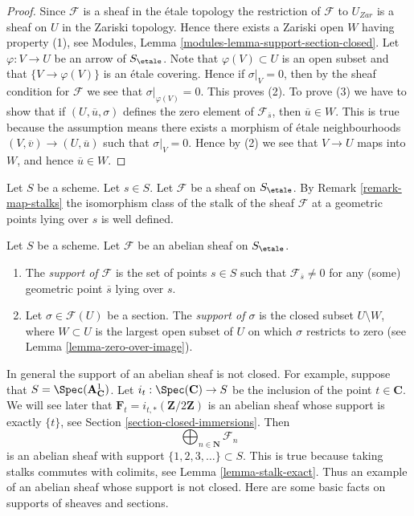 \begin{proof}
Since $\mathcal{F}$ is a sheaf in the \'etale topology the restriction of
$\mathcal{F}$ to $U_{Zar}$ is a sheaf on $U$ in the Zariski topology.
Hence there exists a Zariski open $W$ having property (1), see
Modules, Lemma \ref{modules-lemma-support-section-closed}. Let
$\varphi : V \to U$ be an arrow of $S_\etale$. Note that
$\varphi(V) \subset U$ is an open subset and that
$\{V \to \varphi(V)\}$ is an \'etale covering. Hence if
$\sigma|_V = 0$, then by the sheaf condition for $\mathcal{F}$ we
see that $\sigma|_{\varphi(V)} = 0$. This proves (2).
To prove (3) we have to show that if $(U, \overline{u}, \sigma)$
defines the zero element of $\mathcal{F}_{\overline{s}}$, then
$\overline{u} \in W$. This is true because the assumption means
there exists a morphism of \'etale neighbourhoods
$(V, \overline{v}) \to (U, \overline{u})$ such that
$\sigma|_V = 0$. Hence by (2) we see that $V \to U$ maps into $W$, and
hence $\overline{u} \in W$.
\end{proof}

\noindent
Let $S$ be a scheme. Let $s \in S$.
Let $\mathcal{F}$ be a sheaf on $S_\etale$. By
Remark \ref{remark-map-stalks}
the isomorphism class of the stalk of the sheaf $\mathcal{F}$
at a geometric points lying over $s$ is well defined.

\begin{definition}
\label{definition-support}
Let $S$ be a scheme.
Let $\mathcal{F}$ be an abelian sheaf on $S_\etale$.
\begin{enumerate}
\item The {\it support of $\mathcal{F}$} is the set of
points $s \in S$ such that $\mathcal{F}_{\overline{s}} \not = 0$
for any (some) geometric point $\overline{s}$ lying over $s$.
\item Let $\sigma \in \mathcal{F}(U)$ be a section.
The {\it support of $\sigma$} is the closed subset $U \setminus W$, where
$W \subset U$ is the largest open subset of $U$ on which $\sigma$
restricts to zero (see
Lemma \ref{lemma-zero-over-image}).
\end{enumerate}
\end{definition}

\noindent
In general the support of an abelian sheaf is not closed.
For example, suppose that $S = \Spec(\mathbf{A}^1_{\mathbf{C}})$.
Let $i_t : \Spec(\mathbf{C}) \to S$ be the inclusion of the
point $t \in \mathbf{C}$.
We will see later that $\mathbf{F}_t = i_{t, *}(\mathbf{Z}/2\mathbf{Z})$
is an abelian sheaf whose support is exactly $\{t\}$, see
Section \ref{section-closed-immersions}.
Then
$$
\bigoplus\nolimits_{n \in \mathbf{N}} \mathcal{F}_n
$$
is an abelian sheaf with support $\{1, 2, 3, \ldots\} \subset S$.
This is true because taking stalks commutes with colimits, see
Lemma \ref{lemma-stalk-exact}.
Thus an example of an abelian sheaf whose support is not closed.
Here are some basic facts on supports of sheaves and sections.


